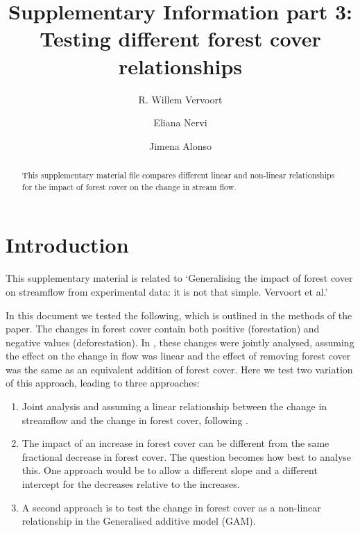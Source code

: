 \documentclass[]{elsarticle} %
\providecommand{\tightlist}{%
  \setlength{\itemsep}{0pt}\setlength{\parskip}{0pt}}
\begin{document}
\begin{frontmatter}

  \title{Supplementary Information part 3: Testing different forest cover relationships}
    \author[]{R. Willem Vervoort%
  }
    \author[]{Eliana Nervi}
    \author[]{Jimena Alonso}
  
  \begin{abstract}
  This supplementary material file compares different linear and non-linear relationships for the impact of forest cover on the change in stream flow.
  \end{abstract}
  
 \end{frontmatter}

\setcounter{table}{0} \renewcommand{\thetable}{S\arabic{table}} \setcounter{figure}{0} \renewcommand{\thefigure}{S\arabic{figure}}\setcounter{equation}{0} \renewcommand{\theequation}{S\arabic{equation}}

\hypertarget{introduction}{%
\section{Introduction}\label{introduction}}

This supplementary material is related to `Generalising the impact of forest cover on streamflow from experimental data: it is not that simple. Vervoort et al.'

In this document we tested the following, which is outlined in the methods of the paper.
The changes in forest cover contain both positive (forestation) and negative values (deforestation). In \citet{zhang2017}, these changes were jointly analysed, assuming the effect on the change in flow was linear and the effect of removing forest cover was the same as an equivalent addition of forest cover. Here we test two variation of this approach, leading to three approaches:

\begin{enumerate}
\def\labelenumi{\arabic{enumi}.}
\tightlist
\item
  Joint analysis and assuming a linear relationship between the change in streamflow and the change in forest cover, following \citet{zhang2017}.
\item
  The impact of an increase in forest cover can be different from the same fractional decrease in forest cover. The question becomes how best to analyse this. One approach would be to allow a different slope and a different intercept for the decreases relative to the increases.
\item
  A second approach is to test the change in forest cover as a non-linear relationship in the Generalised additive model (GAM).
\end{enumerate}
\end{document}
